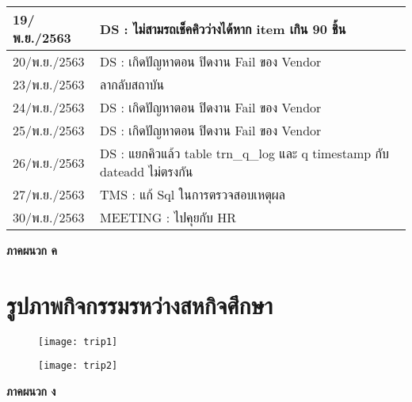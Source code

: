 \begin{longtable}{|l|l|}
	\hline
	19/พ.ย./2563    & DS : ไม่สามรถเช็คคิวว่างได้หาก item เกิน 90 ชิ้น                                \\ 
	\hline
	20/พ.ย./2563    & DS : เกิดปัญหาตอน ปิดงาน Fail ของ Vendor                                        \\ 
	\hline
	23/พ.ย./2563    & ลากลับสถาบัน                                                                    \\ 
	\hline
	24/พ.ย./2563    & DS : เกิดปัญหาตอน ปิดงาน Fail ของ Vendor                                        \\ 
	\hline
	25/พ.ย./2563    & DS : เกิดปัญหาตอน ปิดงาน Fail ของ Vendor                                        \\ 
	\hline
	26/พ.ย./2563    & DS : แยกคิวแล้ว table trn\_q\_log และ q timestamp กับ dateadd ไม่ตรงกัน         \\ 
	\hline
	27/พ.ย./2563    & TMS : แก้ Sql ในการตรวจสอบเหตุผล                                                \\ 
	\hline
	30/พ.ย./2563    & MEETING : ไปคุยกับ HR                                                           \\
	\hline
\end{longtable}
	

\clearpage 
\thispagestyle{empty}
\begin{center}
	\LARGE{\textbf{ภาคผนวก ค}}
\end{center}

\chapter{รูปภาพกิจกรรมรหว่างสหกิจศึกษา}
\begin{figure}[H]
	\centering
	\texttt{[image: trip1]}
	\label{Fig:9997}
\end{figure}

\begin{figure}[H]
	\centering
	\texttt{[image: trip2]}
	\label{Fig:99912}
\end{figure}


\clearpage 
\thispagestyle{empty}
\begin{center}
	\LARGE{\textbf{ภาคผนวก ง}}
\end{center}

